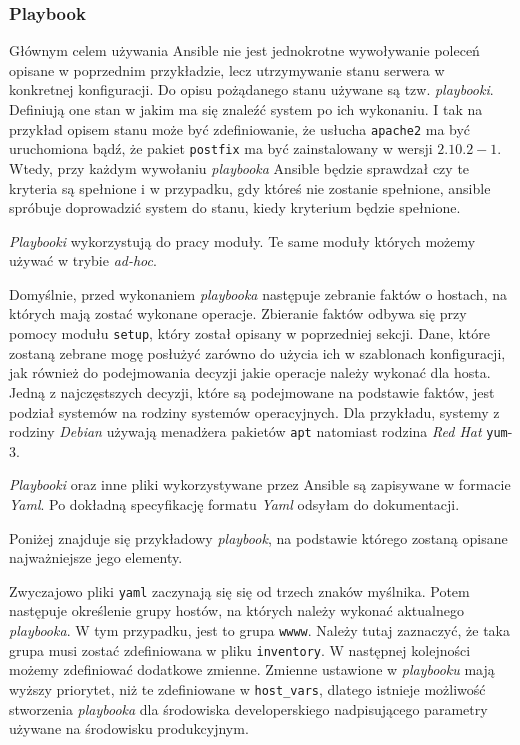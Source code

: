 \subsubsection{Playbook}
Głównym celem używania Ansible nie jest jednokrotne wywoływanie poleceń opisane w poprzednim przykładzie, lecz utrzymywanie stanu serwera w konkretnej konfiguracji.
Do opisu pożądanego stanu używane są tzw. \textit{playbooki}.
Definiują one stan w jakim ma się znaleźć system po ich wykonaniu.
I tak na przykład opisem stanu może być zdefiniowanie, że usłucha \texttt{apache2} ma być uruchomiona bądź, że pakiet \texttt{postfix} ma być zainstalowany w wersji $2.10.2-1$.
Wtedy, przy każdym wywołaniu \textit{playbooka} Ansible będzie sprawdzał czy te kryteria są spełnione i w przypadku, gdy któreś nie zostanie spełnione, ansible spróbuje doprowadzić system do stanu, kiedy kryterium będzie spełnione.

\textit{Playbooki} wykorzystują do pracy moduły. Te same moduły których możemy używać w trybie \textit{ad-hoc}.

Domyślnie, przed wykonaniem \textit{playbooka} następuje zebranie faktów o hostach, na których mają zostać wykonane operacje.
Zbieranie faktów odbywa się przy pomocy modułu \texttt{setup}, który został opisany w poprzedniej sekcji.
Dane, które zostaną zebrane mogę posłużyć zarówno do użycia ich w szablonach konfiguracji, jak również do podejmowania decyzji jakie operacje należy wykonać dla hosta. Jedną z najczęstszych decyzji, które są podejmowane na podstawie faktów, jest podział systemów na rodziny systemów operacyjnych.
Dla przykładu, systemy z rodziny \textit{Debian} używają menadżera pakietów \texttt{apt} natomiast rodzina \textit{Red Hat} \texttt{yum}-3.

\textit{Playbooki} oraz inne pliki wykorzystywane przez Ansible są zapisywane w formacie \textit{Yaml}.
Po dokładną specyfikację formatu \textit{Yaml} odsyłam do dokumentacji.

Poniżej znajduje się przykładowy \textit{playbook}, na podstawie którego zostaną opisane najważniejsze jego elementy.

Zwyczajowo pliki \texttt{yaml} zaczynają się się od trzech znaków myślnika.
Potem następuje określenie grupy hostów, na których należy wykonać aktualnego \textit{playbooka}.
W tym przypadku, jest to grupa \texttt{wwww}.
Należy tutaj zaznaczyć, że taka grupa musi zostać zdefiniowana w pliku \texttt{inventory}.
W następnej kolejności możemy zdefiniować dodatkowe zmienne.
Zmienne ustawione w \textit{playbooku} mają wyższy priorytet, niż te zdefiniowane w \texttt{host\_vars}, dlatego istnieje możliwość stworzenia \textit{playbooka} dla środowiska developerskiego nadpisującego parametry używane na środowisku produkcyjnym.

